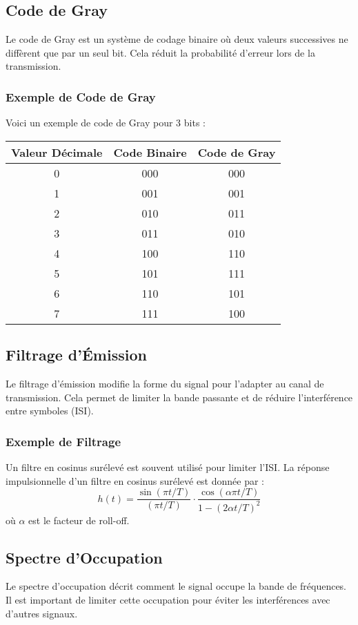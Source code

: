 \documentclass[10pt,a4paper]{article}
\begin{document}
\subsection*{Code de Gray}
Le code de Gray est un système de codage binaire où deux valeurs successives ne diffèrent que par un seul bit. Cela réduit la probabilité d'erreur lors de la transmission.

\subsubsection*{Exemple de Code de Gray}
Voici un exemple de code de Gray pour 3 bits :

\begin{tabular}{|c|c|c|}
    \hline
    Valeur Décimale & Code Binaire & Code de Gray \\
    \hline
    0 & 000 & 000 \\
    1 & 001 & 001 \\
    2 & 010 & 011 \\
    3 & 011 & 010 \\
    4 & 100 & 110 \\
    5 & 101 & 111 \\
    6 & 110 & 101 \\
    7 & 111 & 100 \\
    \hline
\end{tabular}

\subsection*{Filtrage d'Émission}
Le filtrage d'émission modifie la forme du signal pour l'adapter au canal de transmission. Cela permet de limiter la bande passante et de réduire l'interférence entre symboles (ISI).

\subsubsection*{Exemple de Filtrage}
Un filtre en cosinus surélevé est souvent utilisé pour limiter l'ISI. La réponse impulsionnelle d'un filtre en cosinus surélevé est donnée par :
\[ h(t) = \frac{\sin(\pi t / T)}{(\pi t / T)} \cdot \frac{\cos(\alpha \pi t / T)}{1 - (2 \alpha t / T)^2} \]
où $\alpha$ est le facteur de roll-off.

\subsection*{Spectre d'Occupation}
Le spectre d'occupation décrit comment le signal occupe la bande de fréquences. Il est important de limiter cette occupation pour éviter les interférences avec d'autres signaux.
\end{document}
